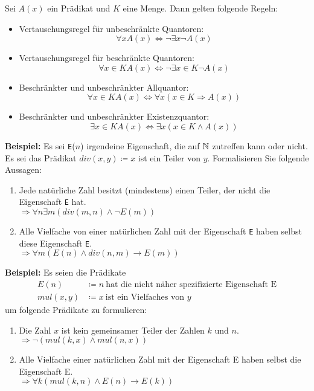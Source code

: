 \begin{definition}{}
    Sei $A(x)$ ein Prädikat und $K$ eine Menge.
    Dann gelten folgende Regeln:
    \begin{itemize}
        \item Vertauschungsregel für unbeschränkte Quantoren: \[\forall x A(x) \Leftrightarrow \neg \exists x \neg A(x)\]
        \item Vertauschungsregel für beschränkte Quantoren: \[\forall x \in K A(x) \Leftrightarrow \neg \exists x \in K \neg A(x)\]
        \item Beschränkter und unbeschränkter Allquantor: \[\forall x \in K A(x) \Leftrightarrow \forall x (x \in K \Rightarrow A(x))\]
        \item Beschränkter und unbeschränkter Existenzquantor: \[\exists x \in K A(x) \Leftrightarrow \exists x (x \in K \land A(x))\]
    \end{itemize}
\end{definition}

\textbf{Beispiel:} Es sei \texttt{E}($n$) irgendeine Eigenschaft, die auf $\mathbb{N}$ zutreffen kann oder nicht.
Es sei das Prädikat $div(x,y) \coloneqq x$ ist ein Teiler von $y$.
Formalisieren Sie folgende Aussagen:
\begin{enumerate}
    \item Jede natürliche Zahl besitzt (mindestens) einen Teiler, der nicht die Eigenschaft \texttt{E} hat. \\ $\Rightarrow \forall n \exists m (div(m,n) \land \neg E(m))$
    \item Alle Vielfache von einer natürlichen Zahl mit der Eigenschaft \texttt{E} haben selbst diese Eigenschaft \texttt{E}. \\ $\Rightarrow \forall m (E(n) \land div(n,m) \rightarrow E(m))$
\end{enumerate}

\textbf{Beispiel:} Es seien die Prädikate
\begin{align*}
    E(n) &\coloneqq n \ \text{hat die nicht näher spezifizierte Eigenschaft E} \\
    mul(x,y) &\coloneqq x \ \text{ist ein Vielfaches von $y$}
\end{align*}
um folgende Prädikate zu formulieren:
\begin{enumerate}
    \item Die Zahl $x$ ist kein gemeinsamer Teiler der Zahlen $k$ und $n$. \\ $\Rightarrow \neg (mul(k,x) \land mul(n,x))$
    \item Alle Vielfache einer natürlichen Zahl mit der Eigenschaft E haben selbst die Eigenschaft E. \\ $\Rightarrow \forall k (mul(k,n) \land E(n) \rightarrow E(k))$
\end{enumerate}

